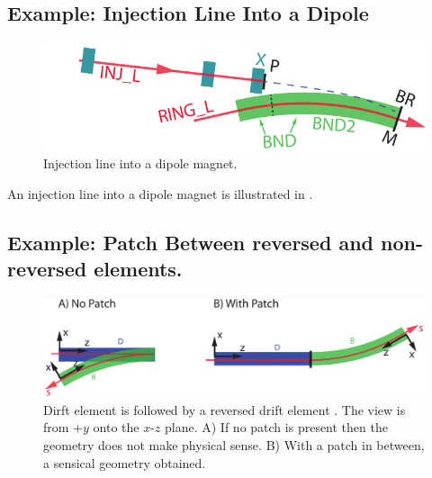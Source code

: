 \subsection{Example: Injection Line Into a Dipole}
\label{s:ex.inj}

\begin{figure}[tb]
  \centering
  \includegraphics[width=5in]{injection.pdf}
  \caption[Injection line into a dipole magnet.]{Injection line into a dipole magnet.}
  \label{f:inject}
\end{figure}

An injection line into a dipole magnet is illustrated in .


\subsection{Example: Patch Between reversed and non-reversed elements.}
\label{s:ex.patch}

\begin{figure}[tb]
  \centering
  \includegraphics[width=5in]{patch-between.pdf}
  \caption[Patching between reversed and non-reversed elements.]{
Dirft element  is followed by a reversed drift element .
The view is from $+y$ onto the $x$-$z$ plane. A) If no patch is
present then the geometry does not make physical sense. B) With a
patch in between, a sensical geometry obtained.}
  \label{f:patch.between}
\end{figure}

